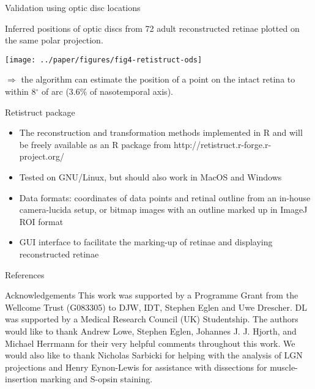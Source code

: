 \documentclass[final]{beamer}
\begin{document}
\begin{frame}{}
\begin{columns}[T]
\begin{column}{.25\linewidth}
      \begin{block}{Validation using optic disc locations}

        Inferred positions of optic discs from 72 adult reconstructed
        retinae plotted on the same polar projection. 

        \texttt{[image: ../paper/figures/fig4-retistruct-ods]}     

        $\Rightarrow$ the algorithm can estimate the position of a
        point on the intact retina to within 8$^{\circ}$ of arc (3.6\%
        of nasotemporal axis).
      \end{block}

      \begin{block}{Retistruct package}
        \begin{itemize}
        \item The reconstruction and transformation methods
          implemented in R and will be freely available as an R
          package from http://retistruct.r-forge.r-project.org/
        \item Tested on GNU/Linux, but should also work in MacOS and
          Windows
        \item Data formats: coordinates of data points and retinal
          outline from an in-house camera-lucida setup, or bitmap
          images with an outline marked up in ImageJ ROI format
        \item GUI interface to facilitate the marking-up of retinae
          and displaying reconstructed retinae
        \end{itemize}
      \end{block}


      \begin{block}{\large References}
        \small
        
        
      \end{block}


      \begin{block}{\large Acknowledgements}
        \small This work was supported by a Programme Grant from the
        Wellcome Trust (G083305) to DJW, IDT, Stephen Eglen and Uwe
        Drescher. DL was supported by a Medical Research Council (UK)
        Studentship. The authors would like to thank Andrew Lowe,
        Stephen Eglen, Johannes J. J.  Hjorth, and Michael Herrmann
        for their very helpful comments throughout this work. We would
        also like to thank Nicholas Sarbicki for helping with the
        analysis of LGN projections and Henry Eynon-Lewis for
        assistance with dissections for muscle-insertion marking and
        S-opsin staining.


\end{block}
\end{column}
\end{columns}
\end{frame}
\end{document}
